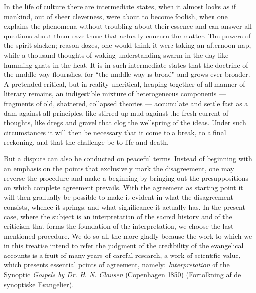 \documentclass[12pt,a4paper,openany]{book}
\newcommand{\opage}[1]{\marginnote{\footnotesize\textit{[#1]}}}
\begin{document}
In the life of culture there are intermediate states, when it almost
looks as if mankind, out of sheer cleverness,
were about to become foolish, when one explains
\setcounter{footnote}{0}%
\opage{290}the phenomena without troubling about their essence
and can answer all questions about them save those that actually
concern the matter. The powers of the spirit slacken; reason dozes,
one would think it were taking an afternoon nap, while
a thousand thoughts of waking understanding swarm in the day
like humming gnats in the heat. It is in such intermediate states
that the doctrine of the middle way flourishes, for ``the middle way
is broad'' and grows ever broader. A pretended
critical, but in reality uncritical, heaping together
of all manner of literary remains, an indigestible mixture of
heterogeneous components --- fragments of old, shattered,
collapsed theories --- accumulate and settle
fast as a dam against all principles, like stirred-up
mud against the fresh current of thoughts, like dregs and gravel
that clog the wellspring of the ideas. Under such circumstances
it will then be necessary that it come to
a break, to a final reckoning, and that the challenge be to
life and death.

But a dispute can also be conducted on peaceful
terms. Instead of beginning with an emphasis
on the points that exclusively mark the disagreement,
one may reverse the procedure and make a beginning
by bringing out the presuppositions on which
complete agreement prevails. With the agreement as starting point
it will then gradually be possible to make it evident
in what the disagreement consists, whence it springs,
and what significance it actually has. In the present
case, where the subject is an interpretation of the sacred
history and of the criticism that forms the foundation of the interpretation,
we choose the last-mentioned procedure.
We do so all the more gladly because the work to which
\setcounter{footnote}{0}%
\opage{291}we in this treatise intend to refer the judgment of
the credibility of the evangelical accounts is a fruit
of many years of careful research, a work of scientific
value, which presents essential points of agreement,
namely: \emph{Interpretation} of the Synoptic \emph{Gospels
by Dr. H. N. Clausen} (Copenhagen 1850) (Fortolkning af de synoptiske Evangelier).
\end{document}

